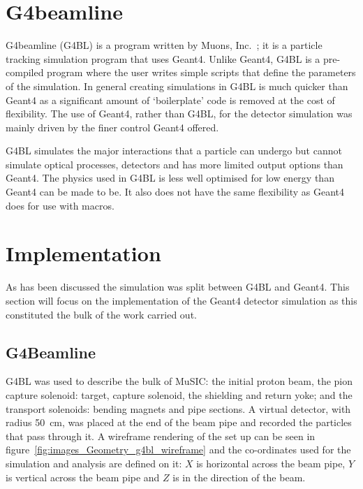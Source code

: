 \section{G4beamline} %
\label{sec:g4beamline}
G4beamline (G4BL) is a program written by Muons, Inc.~\cite{g4bl}; it is a particle tracking simulation program that uses Geant4. Unlike Geant4, G4BL is a pre-compiled program where the user writes simple scripts that define the parameters of the simulation. In general creating simulations in G4BL is much quicker than Geant4 as a significant amount of `boilerplate' code is removed at the cost of flexibility. The use of Geant4, rather than G4BL, for the detector simulation was mainly driven by the finer control Geant4 offered.

G4BL simulates the major interactions that a particle can undergo but cannot simulate optical processes, detectors and has more limited output options than Geant4. The physics used in G4BL is less well optimised for low energy than Geant4 can be made to be. It also does not have the same flexibility as Geant4 does for use with macros.

\section{Implementation} %
\label{cha:implementation}
As has been discussed the simulation was split between G4BL and Geant4. This section will focus on the implementation of the Geant4 detector simulation as this constituted the bulk of the work carried out.

\subsection{G4Beamline} %
\label{sec:g4beamline_impl}
G4BL was used to describe the bulk of MuSIC: the initial proton beam, the pion capture solenoid: target, capture solenoid, the shielding and return yoke; and the transport solenoids: bending magnets and pipe sections. A virtual detector, with radius 50~cm, was placed at the end of the beam pipe and recorded the particles that pass through it. A wireframe rendering of the set up can be seen in figure~\ref{fig:images_Geometry_g4bl_wireframe} and the co-ordinates used for the simulation and analysis are defined on it: \(X\) is horizontal across the beam pipe, \(Y\) is vertical across the beam pipe and \(Z\) is in the direction of the beam.

